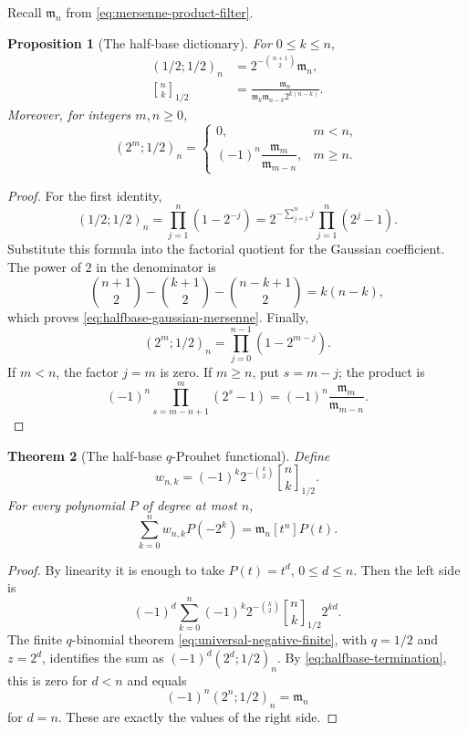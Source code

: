 \documentclass[11pt,oneside,openany]{book}
\newtheorem{theorem}{Theorem}[chapter]
\newtheorem{proposition}[theorem]{Proposition}
\theoremstyle{definition}
\theoremstyle{remark}
\newcommand{\Qbinom}[3]{\genfrac{[}{]}{0pt}{}{#1}{#2}_{#3}}
\begin{document}
Recall $\mathfrak m_n$ from \eqref{eq:mersenne-product-filter}.

\begin{proposition}[The half-base dictionary]\label{prop:half-base-dictionary}
For $0\le k\le n$,
\begin{align}
 (1/2;1/2)_n
 &=2^{-\binom{n+1}{2}}\mathfrak m_n,\label{eq:halfbase-pochhammer-mersenne}\\
 \Qbinom nk{1/2}
 &=\frac{\mathfrak m_n}
 {\mathfrak m_k\mathfrak m_{n-k}2^{k(n-k)}}.\label{eq:halfbase-gaussian-mersenne}
\end{align}
Moreover, for integers $m,n\ge0$,
\begin{equation}
 (2^m;1/2)_n=
 \begin{cases}
 0,&m<n,\\
 (-1)^n\dfrac{\mathfrak m_m}{\mathfrak m_{m-n}},&m\ge n.
 \end{cases}\label{eq:halfbase-termination}
\end{equation}
\end{proposition}

\begin{proof}
For the first identity,
\[
 (1/2;1/2)_n
 =\prod_{j=1}^n(1-2^{-j})
 =2^{-\sum_{j=1}^nj}\prod_{j=1}^n(2^j-1).
\]
Substitute this formula into the factorial quotient for the Gaussian coefficient.  The power of $2$ in the denominator is
\[
 \binom{n+1}{2}-\binom{k+1}{2}-\binom{n-k+1}{2}=k(n-k),
\]
which proves \eqref{eq:halfbase-gaussian-mersenne}.  Finally,
\[
 (2^m;1/2)_n=\prod_{j=0}^{n-1}(1-2^{m-j}).
\]
If $m<n$, the factor $j=m$ is zero.  If $m\ge n$, put $s=m-j$; the product is
\[
 (-1)^n\prod_{s=m-n+1}^{m}(2^s-1)
 =(-1)^n\frac{\mathfrak m_m}{\mathfrak m_{m-n}}.
\]
\end{proof}

\begin{theorem}[The half-base $q$-Prouhet functional]\label{thm:q-prouhet-functional}
Define
\begin{equation}
 w_{n,k}=(-1)^k2^{-\binom k2}\Qbinom nk{1/2}.\label{eq:q-prouhet-weights}
\end{equation}
For every polynomial $P$ of degree at most $n$,
\begin{equation}
 \sum_{k=0}^nw_{n,k}P(-2^k)
 =\mathfrak m_n[t^n]P(t).\label{eq:q-prouhet-functional}
\end{equation}
\end{theorem}

\begin{proof}
By linearity it is enough to take $P(t)=t^d$, $0\le d\le n$.  Then the left side is
\[
 (-1)^d\sum_{k=0}^n(-1)^k2^{-\binom k2}
 \Qbinom nk{1/2}2^{kd}.
\]
The finite $q$-binomial theorem \eqref{eq:universal-negative-finite}, with $q=1/2$ and $z=2^d$, identifies the sum as
$(-1)^d(2^d;1/2)_n$.  By \eqref{eq:halfbase-termination}, this is zero for $d<n$ and equals
\[
 (-1)^n(2^n;1/2)_n=\mathfrak m_n
\]
for $d=n$.  These are exactly the values of the right side.
\end{proof}
\end{document}
